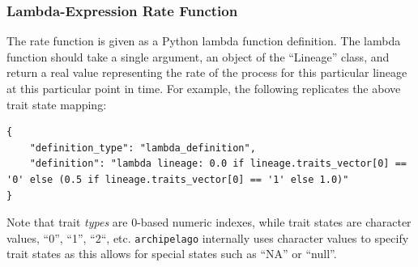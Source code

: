 \documentclass[11pt,openany]{memoir} %
\newcommand{\archipelagoPackage}{\texttt{archipelago}\xspace}
\begin{document}
\subsubsection{Lambda-Expression Rate Function}
The rate function is given as a Python lambda function definition.
The lambda function should take a single argument, an object of the ``Lineage'' class, and return a real value representing the rate of the process for this particular lineage at this particular point in time.
For example, the following replicates the above trait state mapping:
\begin{lstlisting}
{
    "definition_type": "lambda_definition",
    "definition": "lambda lineage: 0.0 if lineage.traits_vector[0] == '0' else (0.5 if lineage.traits_vector[0] == '1' else 1.0)"
}
\end{lstlisting}
Note that trait \textit{types} are 0-based numeric indexes, while trait states are character values, ``0'', ``1'', ``2``, etc. \archipelagoPackage internally uses character values to specify trait states as this allows for special states such as ``NA'' or ``null''.
\end{document}
